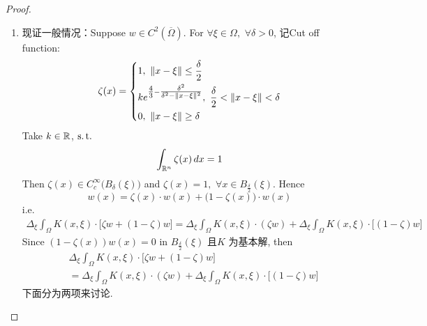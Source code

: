 \begin{proposition}
\begin{proof}
\begin{enumerate}
				\begin{align*}
					\Delta_{\xi} \int_{\Omega} K(x , \xi) \cdot w(x) \, dx 
					&= \Delta_{\xi} \int_{\R^n} K(x , \xi) \cdot \widetilde{w}(x) \, dx \\
					&= \Delta_{\xi} \int_{\R^n} \psi(| x - xi |) \cdot \widetilde{w}(x) \, dx \\
					&= \Delta_{\xi} \int_{\R^n} \psi(| y |) \cdot \widetilde{w}(y + \xi) \, dy \\
					&= \int_{\R^n} \psi(| y |) \cdot \Delta_{\xi} \widetilde{w}(y + \xi) \, dy \\
					&= \int_{\R^n} \psi(| y |) \cdot \Delta_y \widetilde{w}(y + \xi) \, dy \\
					&= \int_{\R^n} \psi(| x - y |) \cdot \Delta_y \widetilde{w}(y) \, dy 
					= \int_{\Omega} K(x , \xi) \cdot \Delta_x w(x) \, dx
					= w(\xi)
				\end{align*}
				(运算的合理性可由逆向得到)
				
				\vspace{4em}
				
				\item 现证一般情况：Suppose $w \in C^2\left( \overline{\Omega} \right)$. For $\forall \xi \in \Omega, \,\, \forall \delta > 0$, 记Cut off function: 
				\begin{align*}
					\zeta(x) = 
					\begin{dcases*}
						1 , \,\, \Vert x - \xi \Vert \leq \dfrac{\delta}{2} \\
						k e^{\tfrac{4}{3} - \tfrac{\delta^2}{\delta^2 - \Vert x - \xi \Vert^2}} , \,\, \frac{\delta}{2} < \Vert x - \xi \Vert < \delta \\
						0 , \,\, \Vert x - \xi \Vert \geq \delta
					\end{dcases*}
				\end{align*}
				Take $k \in \mathbb{R}$, $\operatorname{s.t.}$
				\[ \int_{\mathbb{R}^n} \zeta(x) \, dx = 1 \]
				Then $\zeta(x) \in C_{c}^{\infty} \Big( B_{\delta}(\xi) \Big)$ and $\zeta(x) = 1 , \,\, \forall x \in B_{\tfrac{\delta}{2}}(\xi)$. Hence
				\[ w(x) = \zeta(x) \cdot w(x) + \Big( 1 - \zeta(x) \Big) \cdot w(x) \]
				i.e. 
				\begin{align*}
					\Delta_{\xi} \int_{\Omega} K(x , \xi) \cdot \Big[ \zeta w + (1 - \zeta) w \Big] 
					= \Delta_{\xi} \int_{\Omega} K(x , \xi) \cdot (\zeta w) + \Delta_{\xi} \int_{\Omega} K(x , \xi) \cdot \Big[ (1 - \zeta) w \Big]
				\end{align*}
				Since $(1 - \zeta(x)) w(x) = 0$ in $B_{\tfrac{\delta}{2}}(\xi)$ 且$K$ 为基本解, then 
				\begin{align*}
					&\Delta_{\xi} \int_{\Omega} K(x , \xi) \cdot \Big[ \zeta w + (1 - \zeta) w \Big] \\
					&= \Delta_{\xi} \int_{\Omega} K(x , \xi) \cdot (\zeta w) + \Delta_{\xi} \int_{\Omega} K(x , \xi) \cdot \Big[ (1 - \zeta) w \Big] 
				\end{align*}
				下面分为两项来讨论. 
				

\end{enumerate}
\end{proof}
\end{proposition}

